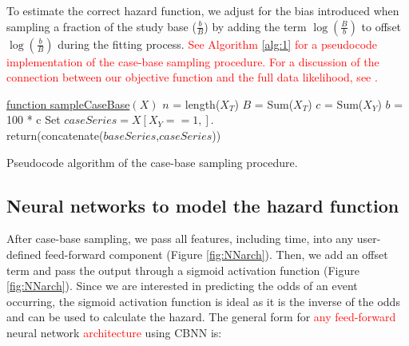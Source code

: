 \documentclass[preprint,12pt,authoryear]{elsarticle}
\begin{document}
To estimate the correct hazard function, we adjust for the bias introduced when sampling a fraction of the study base (\(\frac{b}{B}\)) by adding the term \(\log\left(\frac{B}{b} \right)\) to offset \(\log\left(\frac{b}{B} \right)\) during the fitting process. \textcolor{red}{See Algorithm \ref{alg:1} for a pseudocode implementation of the case-base sampling procedure. For a discussion of the connection between our objective function and the full data likelihood, see \cite{saarela2016case}.}


\begin{algorithm}
\color{red}
 \underline{function sampleCaseBase$(X)$}\;
 $n$ = length($X_{T}$) 
 $B$ = Sum($X_{T}$) 
 $c$ = Sum($X_{Y}$) 
 $b$ = 100 * c 
 Set $caseSeries = X[X_{Y}==1, ]$.\\
 return(concatenate($baseSeries$,$caseSeries$))
 \caption{Pseudocode algorithm of the case-base sampling procedure.}\label{alg:1}
\end{algorithm}

\color{black}


\hypertarget{neural-networks-to-model-the-hazard-function}{%
\subsection{Neural networks to model the hazard
function}\label{neural-networks-to-model-the-hazard-function}}

After case-base sampling, we pass all features, including time, into any user-defined feed-forward component (Figure \ref{fig:NNarch}). Then, we add an offset term and pass the output through a sigmoid activation function (Figure \ref{fig:NNarch}). Since we are interested in predicting the odds of an event occurring, the sigmoid activation function is ideal as it is the inverse of the odds and can be used to calculate the hazard. The general form for \textcolor{red}{any feed-forward} neural network \textcolor{red} {architecture} using CBNN is:
\end{document}
